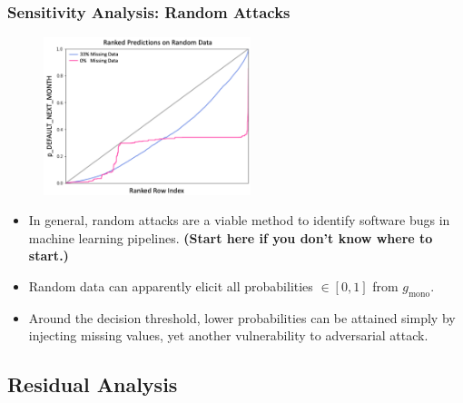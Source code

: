 \documentclass[11pt,
               aspectratio=169,
               hyperref={colorlinks}
               ]{beamer}
\begin{document}
			\begin{frame}[t]
		
		
				\frametitle{\textbf{Sensitivity Analysis}: Random Attacks}
				\vspace{-15pt}
				\begin{figure}
					\begin{center}
						\includegraphics[height=130pt]{../img/ra.png}
					\end{center}
				\end{figure}	
				\vspace{-10pt}
				\begin{itemize}\scriptsize
					\item In general, random attacks are a viable method to identify software bugs in machine learning pipelines. \textbf{(Start here if you don't know where to start.)}
					\item Random data can apparently elicit all probabilities $\in [0, 1]$ from $g_{\text{mono}}$.
					\item Around the decision threshold, lower probabilities can be attained simply by injecting missing values, yet another vulnerability to adversarial attack.
				\end{itemize}
				\normalsize
		
			\end{frame}
			
		\subsection{Residual Analysis}
\end{document}
